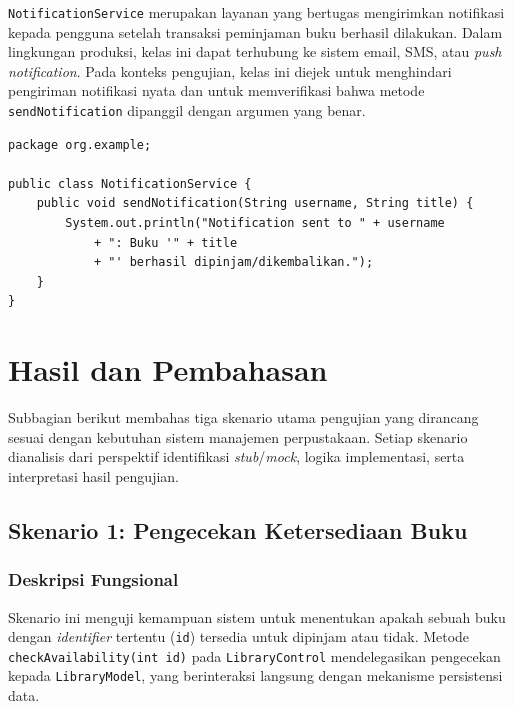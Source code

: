 \documentclass[12pt,a4paper]{article}
\begin{document}
\texttt{NotificationService} merupakan layanan yang bertugas mengirimkan
notifikasi kepada pengguna setelah transaksi peminjaman buku berhasil
dilakukan. Dalam lingkungan produksi, kelas ini dapat terhubung ke sistem
email, SMS, atau \textit{push notification}. Pada konteks pengujian, kelas ini
diejek untuk menghindari pengiriman notifikasi nyata dan untuk memverifikasi
bahwa metode \texttt{sendNotification} dipanggil dengan argumen yang benar.

\begin{lstlisting}[caption={Implementasi kelas \texttt{NotificationService}},
                   label={lst:notification}]
package org.example;

public class NotificationService {
    public void sendNotification(String username, String title) {
        System.out.println("Notification sent to " + username
            + ": Buku '" + title
            + "' berhasil dipinjam/dikembalikan.");
    }
}
\end{lstlisting}

\section{Hasil dan Pembahasan}

Subbagian berikut membahas tiga skenario utama pengujian yang dirancang sesuai
dengan kebutuhan sistem manajemen perpustakaan. Setiap skenario dianalisis dari
perspektif identifikasi \textit{stub}/\textit{mock}, logika implementasi, serta
interpretasi hasil pengujian.

\subsection{Skenario 1: Pengecekan Ketersediaan Buku}

\subsubsection{Deskripsi Fungsional}

Skenario ini menguji kemampuan sistem untuk menentukan apakah sebuah buku
dengan \textit{identifier} tertentu (\texttt{id}) tersedia untuk dipinjam atau
tidak. Metode \texttt{checkAvailability(int id)} pada \texttt{LibraryControl}
mendelegasikan pengecekan kepada \texttt{LibraryModel}, yang berinteraksi
langsung dengan mekanisme persistensi data.
\end{document}
